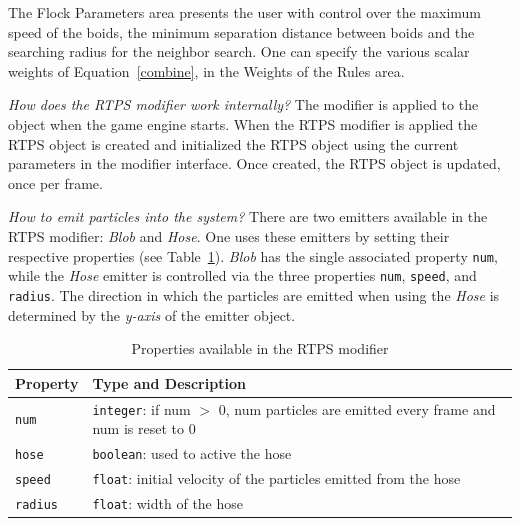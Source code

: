 The Flock Parameters area presents the user with control over the maximum speed of the boids, the minimum separation distance between boids and the searching radius for the neighbor search. One can specify the various scalar weights of Equation~\ref{combine}, in the Weights of the Rules area.

\textit{How does the RTPS modifier work internally?} The modifier is applied to the object when the game engine starts. When the RTPS modifier is applied the RTPS object is created and initialized the RTPS object using the current parameters in the modifier interface. Once created, the RTPS object is updated, once per frame. 

\textit{How to emit particles into the system?} There are two emitters available in the RTPS modifier: \textit{Blob} and \textit{Hose}. One uses these emitters by setting their respective properties (see Table~\ref{properties}). \textit{Blob} has the single associated property \texttt{num}, while the \textit{Hose} emitter is controlled via the three properties \texttt{num}, \texttt{speed}, and \texttt{radius}. The direction in which the particles are emitted when using the \textit{Hose} is determined by the \textit{y-axis} of the emitter object. 

\begin{table}[htdp]
\caption{Properties available in the RTPS modifier}
\begin{center}
\begin{tabular}{|p{3cm}|p{9cm}|}
\hline 
\textbf{Property} & \textbf{Type and Description} \\\hline 
\texttt{num} 	& \texttt{integer}: if num $>$ 0, num particles are emitted every frame and num is reset to 0	\\\hline 
\texttt{hose}	& \texttt{boolean}: used to active the hose	\\\hline
\texttt{speed}	& \texttt{float}: initial velocity of the particles emitted from the hose	\\\hline
\texttt{radius}	& \texttt{float}: width of the hose	\\ %
\hline 
\end{tabular}
\end{center}
\label{properties}
\end{table}


